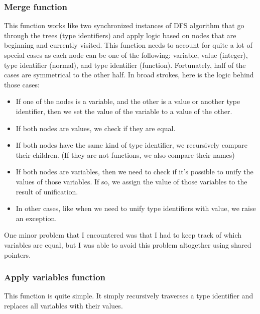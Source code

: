 \documentclass[12pt]{report}
\begin{document}
\subsubsection{Merge function} 
This function works like two synchronized instances of DFS algorithm that go through the trees (type identifiers) and apply logic based on nodes that are beginning and currently visited. 
This function needs to account for quite a lot of special cases as each node can be one of the following: variable, value (integer), type identifier (normal), and type identifier (function). Fortunately, half of the cases are symmetrical to the other half. In broad strokes, here is the logic behind those cases: 
\begin{itemize} 
   \item If one of the nodes is a variable, and the other is a value or another type identifier, then we set the value of the variable to a value of the other. 
   \item If both nodes are values, we check if they are equal. 
   \item If both nodes have the same kind of type identifier, we recursively compare their children. (If they are not functions, we also compare their names) 
   \item If both nodes are variables, then we need to check if it's possible to unify the values of those variables. If so, we assign the value of those variables to the result of unification. 
   \item In other cases, like when we need to unify type identifiers with value, we raise an exception. 
\end{itemize} 
One minor problem that I encountered was that I had to keep track of which variables are equal, but I was able to avoid this problem altogether using shared pointers. 
\subsubsection{Apply variables function} 
This function is quite simple. It simply recursively traverses a type identifier and replaces all variables with their values. 
\end{document}
